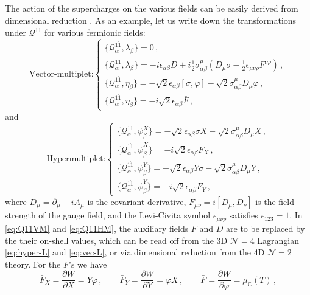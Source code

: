 \documentclass[12pt,a4paper]{article}
\renewcommand{\(}{\left(}
\renewcommand{\)}{\right)}
\renewcommand{\(}{\left(}
\renewcommand{\)}{\right)}
\begin{document}
\medskip
The action of the supercharges on the various fields can be easily derived from dimensional reduction \cite{Aharony_1997,Closset_2019}. 
As an example, let us write down the transformations under $\mathcal{Q}^{1\dot{1}}$ for various fermionic fields:
\begin{equation}\label{eq:Q11VM}
\text{Vector-multiplet:}\left\{
\begin{array}{l}
\{\mathcal{Q}^{1\dot{1}}_\alpha,\lambda_\beta\} =0\,,   \\
\{\mathcal{Q}^{1\dot{1}}_\alpha,\bar{\lambda}_\beta\}=-i\epsilon_{\alpha\beta}D+i\frac{1}{2}\sigma^{\mu}_{\alpha\beta}(D_\mu\sigma-\frac{1}{2}\epsilon_{\mu\nu\rho}F^{\nu\rho})\,,\\
\{\mathcal{Q}^{1\dot{1}}_\alpha,\eta_\beta\}=-\sqrt{2}\epsilon_{\alpha\beta}[\sigma,\varphi]-\sqrt{2}\sigma^\mu_{\alpha\beta}D_\mu\varphi\,,\\
\{\mathcal{Q}^{1\dot{1}}_\alpha,\bar{\eta}_\beta\}=-i\sqrt{2}\epsilon_{\alpha\beta}\bar{F}\,,
\end{array}
\right.
\end{equation}
and
\begin{equation}\label{eq:Q11HM}
\text{Hypermultiplet:}\left\{
\begin{array}{l}
\{\mathcal{Q}^{1\dot{1}}_\alpha,\psi^X_\beta\}=-\sqrt{2}\epsilon_{\alpha\beta}\sigma X-\sqrt{2}\sigma^\mu_{\alpha\beta}D_\mu X\,,\\
\{\mathcal{Q}^{1\dot{1}}_\alpha,\bar{\psi}^X_\beta\}=-i\sqrt{2}\epsilon_{\alpha\beta}\bar{F}_X\,,\\
\{\mathcal{Q}^{1\dot{1}}_\alpha,\psi^Y_\beta\}=-\sqrt{2}\epsilon_{\alpha\beta}Y\sigma -\sqrt{2}\sigma^\mu_{\alpha\beta}D_\mu Y\,,\\
\{\mathcal{Q}^{1\dot{1}}_\alpha,\bar{\psi}^Y_\beta\}=-i\sqrt{2}\epsilon_{\alpha\beta}\bar{F}_Y\,,
\end{array}\right.
\end{equation}
where $D_\mu=\partial_\mu-iA_\mu$ is the covariant derivative, $F_{\mu\nu}=i[D_\mu,D_\nu]$ is the field strength of the gauge field, and the Levi-Civita symbol $\epsilon_{\mu\nu\rho}$ satisfies $\epsilon_{123}=1$. 
In \eqref{eq:Q11VM} and \eqref{eq:Q11HM}, the auxiliary fields $F$ and $D$ are to be replaced by the their on-shell values, which can be read off from the 3D $\mathcal{N}=4$ Lagrangian \eqref{eq:hyper-L} and \eqref{eq:vec-L}, or via dimensional reduction from the 4D $\mathcal{N}=2$ theory. 
For the $F$'s we have
\begin{equation}
\bar{F}_X=\frac{\partial W}{\partial X}=Y\varphi \,,
\qquad 
\bar{F}_Y=\frac{\partial W}{\partial Y}=\varphi X\,,
\qquad
\bar{F}=\frac{\partial W}{\partial \varphi}=\mu_{\mathbb{C}}(T)
\,,
\end{equation}
\end{document}
